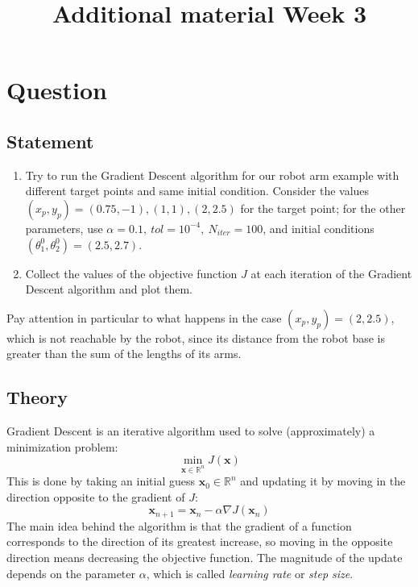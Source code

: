 \documentclass{article}
\title{Additional material Week 3}
\begin{document}
\maketitle

\section{Question}
\subsection{Statement}
\begin{enumerate}
\item[] Try to run the Gradient Descent algorithm for our robot arm example with different target points and same initial condition.
Consider the values $(x_p, y_p)=(0.75, -1), (1, 1), (2, 2.5)$ for the target point; for the other parameters, use $\alpha=0.1,\ tol=10^{-4},\ N_{iter}=100$, and initial conditions $(\theta_1^0, \theta_2^0)=(2.5, 2.7)$.
\item[] Collect the values of the objective function $J$ at each iteration of the Gradient Descent algorithm and plot them.
\end{enumerate}
Pay attention in particular to what happens in the case $(x_p, y_p)=(2, 2.5)$, which is not reachable by the robot, since its distance from the robot base is greater than the sum of the lengths of its arms.


\subsection{Theory}
Gradient Descent is an iterative algorithm used to solve (approximately) a minimization problem:
\begin{equation}
	\min_{\mathbf{x} \in \mathbb{R}^n} J(\mathbf{x})
\end{equation}
This is done by taking an initial guess $\mathbf{x}_0 \in \mathbb{R}^n$ and updating it by moving in the direction opposite to the gradient of $J$:
\begin{equation}
	\mathbf{x}_{n+1} = \mathbf{x}_n - \alpha \nabla J(\mathbf{x}_n)
\end{equation}
The main idea behind the algorithm is that the gradient of a function corresponds to the direction of its greatest increase, so moving in the opposite direction means decreasing the objective function. The magnitude of the update depends on the parameter $\alpha$, which is called \emph{learning rate} or \emph{step size}.
\end{document}
